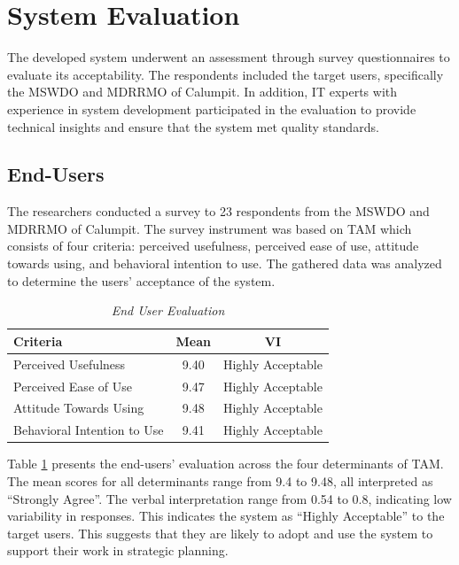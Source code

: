 \section{System Evaluation}
	The developed system underwent an assessment through survey questionnaires to evaluate its acceptability. The respondents included the target users, specifically the MSWDO and MDRRMO of Calumpit. In addition, IT experts with experience in system development participated in the evaluation to provide technical insights and ensure that the system met quality standards.

\subsection{End-Users}
	The researchers conducted a survey to 23 respondents from the MSWDO and MDRRMO of Calumpit. The survey instrument was based on TAM which consists of four criteria: perceived usefulness, perceived ease of use, attitude towards using, and behavioral intention to use. The gathered data was analyzed to determine the users’ acceptance of the system. 

	\begin{table}[h!]
		\centering
		\caption{\textit{End User Evaluation}}
		\label{enduseeval}
		\renewcommand{\arraystretch}{1.3}
			\begin{tabular}{p{10cm}cc}
				\hline
				\textbf{Criteria} & \textbf{Mean} & \textbf{VI}  \\
				\hline
				Perceived Usefulness 
				& 9.40 & Highly Acceptable  \\
				Perceived Ease of Use
				& 9.47& Highly Acceptable  \\
				Attitude Towards Using
				& 9.48 & Highly Acceptable  \\
				Behavioral Intention to Use
				& 9.41 & Highly Acceptable  \\
				\hline
			\end{tabular}
		
	\end{table}
	Table \ref{enduseeval} presents the end-users' evaluation across the four determinants of TAM. The mean scores for all determinants range from 9.4 to 9.48, all interpreted as “Strongly Agree”. The verbal interpretation range from 0.54 to 0.8, indicating low variability in responses. This indicates the system as “Highly Acceptable” to the target users. This suggests that they are likely to adopt and use the system to support their work in strategic planning.
	
